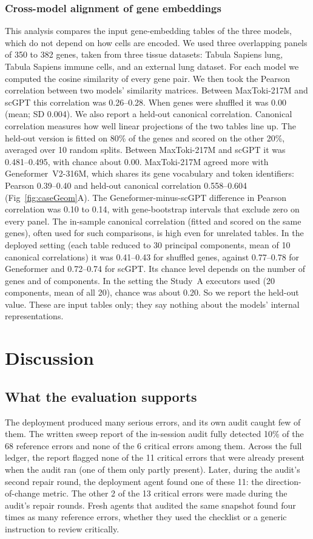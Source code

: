 \documentclass[10pt,letterpaper]{article}
\begin{document}
\subsubsection*{Cross-model alignment of gene embeddings}
This analysis compares the input gene-embedding tables of the three
models, which do not depend on how cells are encoded. We used three
overlapping panels of 350 to 382 genes, taken from three tissue
datasets: Tabula Sapiens lung, Tabula Sapiens immune cells, and an
external lung dataset. For each model we computed the cosine similarity
of every gene pair. We then took the Pearson correlation between two
models' similarity matrices. Between MaxToki-217M and scGPT this
correlation was 0.26--0.28. When genes were shuffled it was 0.00 (mean;
SD 0.004). We also report a held-out canonical correlation. Canonical
correlation measures how well linear projections of the two tables line
up. The held-out version is fitted on 80\% of the genes and scored on
the other 20\%, averaged over 10 random splits. Between MaxToki-217M and
scGPT it was 0.481--0.495, with chance about 0.00. MaxToki-217M agreed
more with Geneformer~V2-316M, which shares its gene vocabulary and token
identifiers: Pearson 0.39--0.40 and held-out canonical correlation
0.558--0.604 (Fig~\ref{fig:caseGeom}A).
The Geneformer-minus-scGPT difference in Pearson correlation was 0.10 to
0.14, with gene-bootstrap intervals that exclude zero on every panel. The
in-sample canonical correlation (fitted and scored on the same genes),
often used for such comparisons, is high even for unrelated tables. In
the deployed setting (each table reduced to 30 principal components, mean
of 10 canonical correlations) it was 0.41--0.43 for shuffled genes,
against 0.77--0.78 for Geneformer and 0.72--0.74 for scGPT. Its chance
level depends on the number of genes and of components. In the setting
the Study~A executors used (20 components, mean of all 20), chance was
about 0.20. So we report the held-out value. These are input tables only; they say nothing
about the models' internal representations.

\section*{Discussion}

\subsection*{What the evaluation supports}
The deployment produced many serious errors, and its own audit caught few
of them. The written sweep report of the in-session audit fully detected
10\% of the 68 reference errors and none of the 6 critical errors among
them. Across the full ledger, the report flagged none of the 11 critical
errors that were already present when the audit ran (one of them only
partly present). Later, during the audit's second repair round, the
deployment agent found one of these 11: the direction-of-change metric.
The other 2 of the 13 critical errors were made during the
audit's repair rounds. Fresh agents that audited the same snapshot found four times as
many reference errors, whether they used the checklist or a generic
instruction to review critically.
\end{document}
